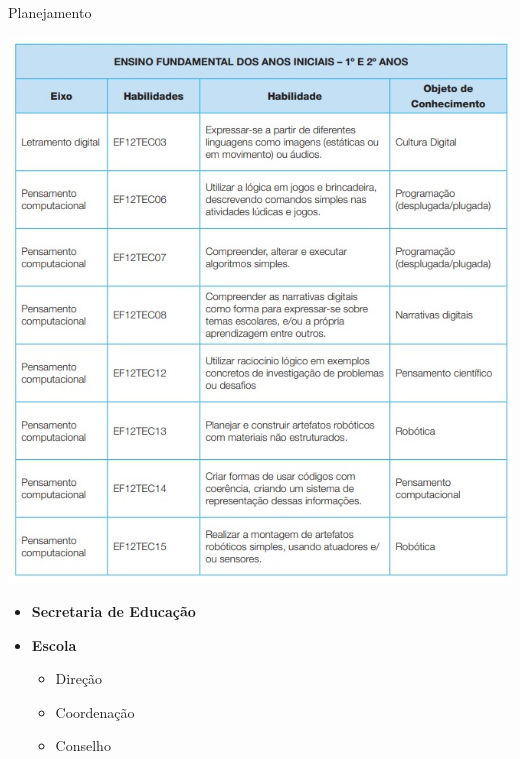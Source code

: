 {	\vfill
	\pagebreak	
	
\begin{multicols}{2}
	\Huge Planejamento

\vfill\null
\columnbreak

			
		
\end{multicols}
		\vfill
		\pagebreak

\begin{center}
			\includegraphics[height=\textheight]{./IMG-GIT/ano-1-e-2.jpeg}
\end{center}


\vfill
\pagebreak


\begin{multicols}{2}
	
\begin{itemize}	
\Large \item \textbf{Secretaria de Educação}
\item\textbf{Escola}

\large
\begin{itemize}
 	\item Direção
	\item Coordenação
	\item Conselho
\end{itemize}



\end{itemize}
\end{multicols}}

